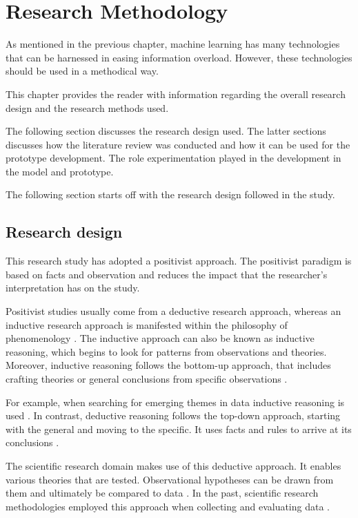 \chapter{Research Methodology}
\label{chap: Chapter 4}

As mentioned in the previous chapter, machine learning has many technologies that can be harnessed in easing information overload. However, these technologies should be used in a methodical way.

This chapter provides the reader with information regarding the overall research design and the research methods used.

The following section discusses the research design used. The latter sections discusses how the literature review was conducted and how it can be used for the prototype development. The role experimentation played in the development in the model and prototype.

The following section starts off with the research design followed in the study.

\section{Research design}

This research study has adopted a positivist approach. The positivist paradigm is based on facts and observation \cite{wilson2014essentials} and reduces the impact that the researcher’s interpretation has on the study.

Positivist studies usually come from a deductive research approach, whereas an inductive research approach is manifested within the philosophy of phenomenology \cite{saunders2007research}. The inductive approach can also be known as inductive reasoning, which begins to look for patterns from observations and theories. Moreover, inductive reasoning follows the bottom-up approach, that includes crafting theories or general conclusions from specific observations \cite{saunders2007research}.

For example, when searching for emerging themes in data inductive reasoning is used \cite{Fereday2006}. In contrast, deductive reasoning follows the top-down approach, starting with the general and moving to the specific. It uses facts and rules to arrive at its conclusions \cite{Fereday2006}.

The scientific research domain makes use of this deductive approach. It enables various theories that are tested. Observational hypotheses can be drawn from them and ultimately be compared to data \cite{bechtel2013philosophy}. In the past, scientific research methodologies employed this approach when collecting and evaluating data \cite{MARSDEN2018A1}.

